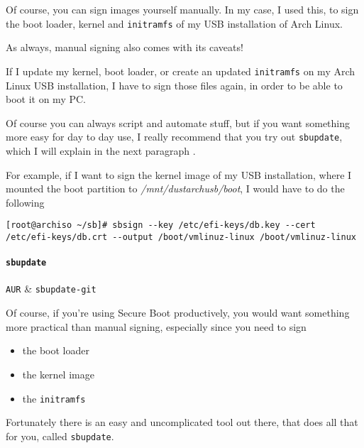 \documentclass[10pt]{dustdoc}
\begin{document}
Of course, you can sign images yourself manually.
In my case, I used this, to sign the boot loader, kernel and \texttt{initramfs} of my USB installation of Arch Linux.

\begin{NOTE}
    As always, manual signing also comes with its caveats!

    If I update my kernel, boot loader, or create an updated \texttt{initramfs} on my Arch Linux USB installation, I have to sign those files again, in order to be able to boot it on my PC.

    Of course you can always script and automate stuff, but if you want something more easy for day to day use, I really recommend that you try out \texttt{sbupdate},  which I will explain in the next paragraph .
\end{NOTE}

For example, if I want to sign the kernel image of my USB installation, where I mounted the boot partition to \textit{/mnt/dustarchusb/boot}, I would have to do the following

\begin{verbatim}
[root@archiso ~/sb]# sbsign --key /etc/efi-keys/db.key --cert /etc/efi-keys/db.crt --output /boot/vmlinuz-linux /boot/vmlinuz-linux
\end{verbatim}

\paragraph{\texttt{sbupdate}}
\label{par:sbupdate}

\begin{packagetable}
    \texttt{AUR} & \texttt{sbupdate-git} \\
\end{packagetable}

Of course, if you’re using Secure Boot productively, you would want something more practical than manual signing, especially since you need to sign

\begin{itemize}
    \item the boot loader

    \item the kernel image

    \item the \texttt{initramfs}
\end{itemize}

Fortunately there is an easy and uncomplicated tool out there, that does all that for you, called \texttt{sbupdate}.
\end{document}
